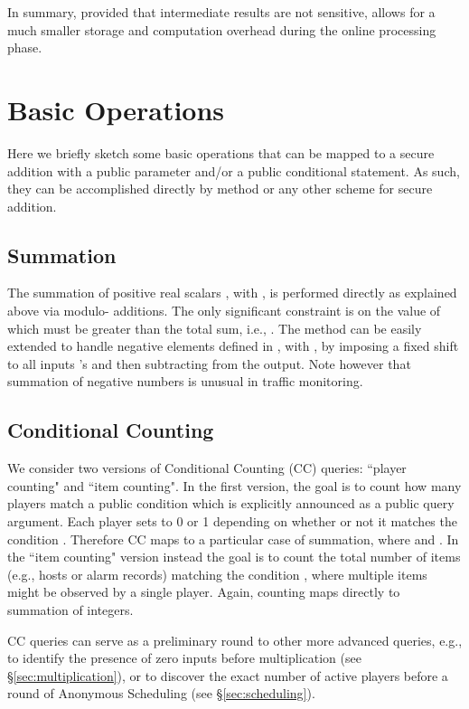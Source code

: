 \documentclass{sig-alternate}
\begin{document}
In summary, provided that intermediate results are not sensitive, \ata allows for a much smaller storage and computation overhead during the online processing phase.


\section{Basic Operations}\label{sec:operations}
Here we briefly sketch some basic operations that can be mapped to a secure addition
with a public parameter and/or a public conditional statement.
As such, they can be accomplished directly by   \ata method  or any other scheme for secure addition.


\subsection{Summation}\label{sec:summation}
The summation of positive real scalars , with , is performed directly as explained above via modulo- additions. The only significant  constraint is on the value of  which must be greater than the total sum, i.e., . 
The method can be easily extended to handle negative elements defined in , with , by imposing a fixed shift  to all inputs 's and then subtracting  from the output.  Note however that summation of negative numbers is unusual in  traffic monitoring.

\subsection{Conditional Counting}\label{sec:counting}
We consider two versions of Conditional Counting (CC) queries: ``player counting"  and ``item counting".
In the first version, the goal is to count how many players match a public condition  which is
explicitly announced as a public query argument.
Each player  sets  to 0 or 1 depending on whether or not it matches the condition .
Therefore CC maps to a particular case of summation, where  and .  In the ``item counting" version instead the goal is to count the total number of items (e.g., hosts or alarm records) matching the condition , where multiple items might be observed by a single player. Again, counting maps directly to summation of integers.

CC queries can serve as a preliminary round to other more advanced queries, e.g., to identify the presence of zero inputs before multiplication (see \S \ref{sec:multiplication}), or to discover the exact number of active players  before a round of Anonymous Scheduling (see \S \ref{sec:scheduling}). 
\end{document}

